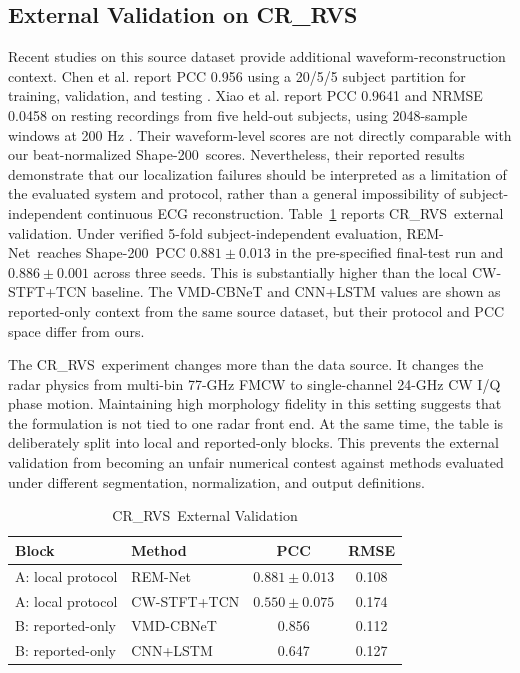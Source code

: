\documentclass[lettersize,journal]{IEEEtran}
\newcommand{\remnet}{REM-Net\xspace}
\newcommand{\shape}{Shape-200\xspace}
\newcommand{\crrvs}{CR\_RVS\xspace}
\begin{document}
\subsection{External Validation on \crrvs}
Recent studies on this source dataset provide additional waveform-reconstruction context. Chen et al. report PCC 0.956 using a 20/5/5 subject partition for training, validation, and testing \cite{chen2026adaptivevmd}. Xiao et al. report PCC 0.9641 and NRMSE 0.0458 on resting recordings from five held-out subjects, using 2048-sample windows at 200 Hz \cite{xiao2026cawtbnet}. Their waveform-level scores are not directly comparable with our beat-normalized \shape\ scores. Nevertheless, their reported results demonstrate that our localization failures should be interpreted as a limitation of the evaluated system and protocol, rather than a general impossibility of subject-independent continuous ECG reconstruction.
Table~\ref{tab:crrvs} reports \crrvs\ external validation. Under verified 5-fold subject-independent evaluation, \remnet\ reaches \shape\ PCC $0.881 \pm 0.013$ in the pre-specified final-test run and $0.886 \pm 0.001$ across three seeds. This is substantially higher than the local CW-STFT+TCN baseline. The VMD-CBNeT and CNN+LSTM values are shown as reported-only context from the same source dataset, but their protocol and PCC space differ from ours.

The \crrvs\ experiment changes more than the data source. It changes the radar physics from multi-bin 77-GHz FMCW to single-channel 24-GHz CW I/Q phase motion. Maintaining high morphology fidelity in this setting suggests that the formulation is not tied to one radar front end. At the same time, the table is deliberately split into local and reported-only blocks. This prevents the external validation from becoming an unfair numerical contest against methods evaluated under different segmentation, normalization, and output definitions.

\begin{table}[!t]
\centering
\caption{\crrvs\ External Validation}
\label{tab:crrvs}
\begin{tabular}{llcc}
\toprule
Block & Method & PCC & RMSE \\
\midrule
A: local protocol & \remnet & $\mathbf{0.881 \pm 0.013}$ & 0.108 \\
A: local protocol & CW-STFT+TCN & $0.550 \pm 0.075$ & 0.174 \\
\midrule
B: reported-only & VMD-CBNeT \cite{xu2025vmdcbnet} & 0.856 & 0.112 \\
B: reported-only & CNN+LSTM \cite{xu2025vmdcbnet} & 0.647 & 0.127 \\
\bottomrule
\end{tabular}
\end{table}
\end{document}
